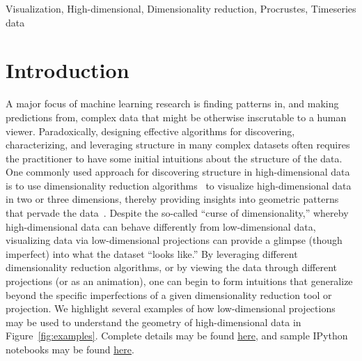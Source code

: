 \documentclass[twoside,11pt]{article}
\begin{document}
\begin{keywords}
  Visualization, High-dimensional, Dimensionality reduction, Procrustes, Timeseries data
\end{keywords}

\section{Introduction}
A major focus of machine learning research is finding patterns in, and making predictions from, complex data that might be otherwise inscrutable to a human viewer.  Paradoxically, designing effective algorithms for discovering, characterizing, and leveraging structure in many complex datasets often requires the practitioner to have some initial intuitions about the structure of the data.  One commonly used approach for discovering structure in high-dimensional data is to use dimensionality reduction algorithms~\citep[e.g.][]{Pear01, TippBish99, JuttHera91, ComoEtal91, Torg58, MaatHint08} to visualize high-dimensional data in two or three dimensions, thereby providing insights into geometric patterns that pervade the data~\citep{UddeEtal16}.  Despite the so-called ``curse of dimensionality,'' whereby high-dimensional data can behave differently from low-dimensional data, visualizing data via low-dimensional projections can provide a glimpse (though imperfect) into what the dataset ``looks like.''  By leveraging different dimensionality reduction algorithms, or by viewing the data through different projections (or as an animation), one can begin to form intuitions that generalize beyond the specific imperfections of a given dimensionality reduction tool or projection.  We highlight several examples of how low-dimensional projections may be used to understand the geometry of high-dimensional data in Figure~\ref{fig:examples}.  Complete details may be found \href{https://arxiv.org/abs/1701.08290}{\underline{here}}, and sample IPython notebooks may be found \href{https://github.com/ContextLab/hypertools-paper-notebooks}{\underline{here}}.
\end{document}
